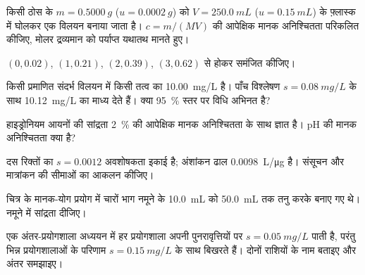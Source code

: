 \begin{exercise}[$\star$]\label{exo:b2:measurement-statistics:3}
किसी ठोस के $m = \qty{0.5000}{g}$ ($u = \qty{0.0002}{g}$) को
$V = \qty{250.0}{mL}$ ($u = \qty{0.15}{mL}$) के फ़्लास्क में घोलकर एक विलयन बनाया जाता है। $c = m/(MV)$ की आपेक्षिक मानक अनिश्चितता परिकलित कीजिए,
मोलर द्रव्यमान को पर्याप्त यथातथ मानते हुए।
\end{exercise}

\begin{exercise}[$\star$]\label{exo:b2:measurement-statistics:4}
$(0, 0.02)$, $(1, 0.21)$, $(2, 0.39)$, $(3, 0.62)$ से होकर  समंजित कीजिए।
\end{exercise}

\begin{exercise}[$\star\star$]\label{exo:b2:measurement-statistics:5}
किसी प्रमाणित संदर्भ विलयन में किसी तत्व का \qty{10.00}{mg/L} है। पाँच विश्लेषण
$s = \qty{0.08}{mg/L}$ के साथ \qty{10.12}{mg/L} का माध्य देते हैं। क्या 95~\% स्तर पर विधि अभिनत है?
\end{exercise}

\begin{exercise}[$\star\star$]\label{exo:b2:measurement-statistics:6}
हाइड्रोनियम आयनों की सांद्रता 2~\% की आपेक्षिक मानक अनिश्चितता के साथ ज्ञात है। pH की
मानक अनिश्चितता क्या है?
\end{exercise}

\begin{exercise}[$\star\star$]\label{exo:b2:measurement-statistics:7}
दस रिक्तों का $s = 0.0012$ अवशोषकता इकाई है; अंशांकन ढाल \qty{0.0098}{L/\micro g} है।
संसूचन और मात्रांकन की सीमाओं का आकलन कीजिए।
\end{exercise}

\begin{exercise}[$\star\star$]\label{exo:b2:measurement-statistics:8}
चित्र के मानक-योग प्रयोग में चारों भाग नमूने के \qty{10.0}{mL} को
\qty{50.0}{mL} तक तनु करके बनाए गए थे। नमूने में सांद्रता दीजिए।
\end{exercise}

\begin{exercise}[$\star\star$]\label{exo:b2:measurement-statistics:9}
एक अंतर-प्रयोगशाला अध्ययन में हर प्रयोगशाला अपनी पुनरावृत्तियों पर $s = \qty{0.05}{mg/L}$ पाती है, परंतु
भिन्न प्रयोगशालाओं के परिणाम $s = \qty{0.15}{mg/L}$ के साथ बिखरते हैं। दोनों राशियों के नाम बताइए और
अंतर समझाइए।
\end{exercise}

